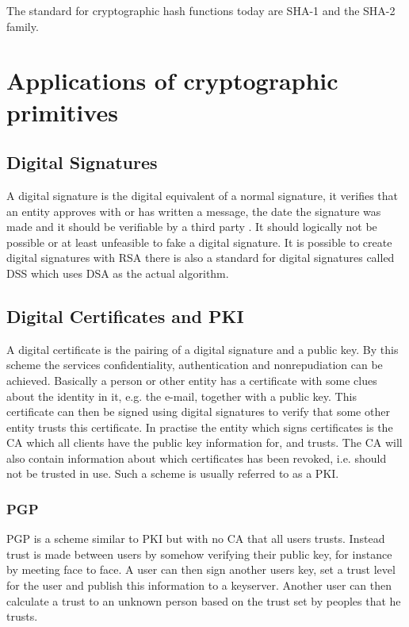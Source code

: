 \documentclass[pdftex,english,10pt,b5paper,twoside]{book}
\begin{document}
The standard for cryptographic hash functions today are \ac{SHA}-1 and the
\ac{SHA}-2 family.

\section{Applications of cryptographic primitives}

\subsection{Digital Signatures}
A digital signature is the digital equivalent of a normal signature, it
verifies that an entity approves with or has written a message, the date the
signature was made and it should be verifiable by a third party \cite[p.
379]{stallings}. It should logically not be possible or at least unfeasible to
fake a digital signature. It is possible to create digital signatures with
\ac{RSA} there is also a standard for digital signatures called \ac{DSS} which
uses \ac{DSA} as the actual algorithm.

\subsection{Digital Certificates and PKI} A digital certificate is the pairing
of a digital signature and a public key\cite{stallings}.  By this scheme the
services confidentiality, authentication and nonrepudiation can be achieved.
Basically a person or other entity has a certificate with some clues about the
identity in it, e.g. the e-mail, together with a public key. This certificate
can then be signed using digital signatures to verify that some other entity
trusts this certificate. In practise the entity which signs certificates is the
\ac{CA} which all clients have the public key information for, and trusts. The
\ac{CA} will also contain information about which certificates has been
revoked, i.e. should not be trusted in use. Such a scheme is usually referred
to as a \ac{PKI}.

\subsubsection{PGP} \ac{PGP} is a scheme similar to \ac{PKI} but with no
\ac{CA} that all users trusts\cite{stallings}. Instead trust is made between
users by somehow verifying their public key, for instance by meeting face to
face. A user can then sign another users key, set a trust level for the user
and publish this information to a keyserver. Another user can then calculate a
trust to an unknown person based on the trust set by peoples that he trusts. 
\end{document}

